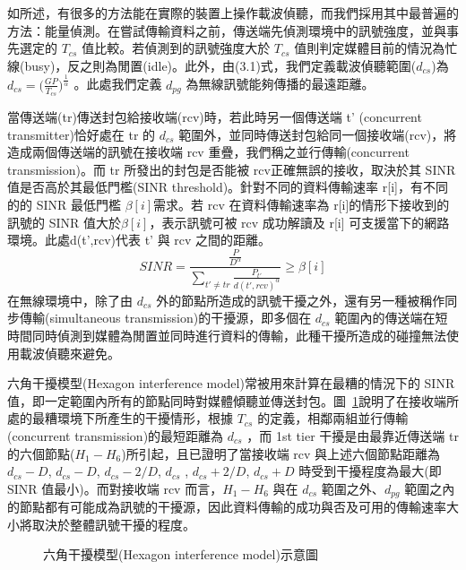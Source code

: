 \documentclass[12pt,a4paper]{article}
\newcommand{\Fig}[1]{圖~\ref{#1}}
\begin{document}
\begin{description}
\begin{enumerate}
如\cite{sigcomm05_rwpcs}所述，有很多的方法能在實際的裝置上操作載波偵聽，而我們採用其中最普遍的方法：能量偵測。在嘗試傳輸資料之前，傳送端先偵測環境中的訊號強度，並與事先選定的 $T_{cs}$ 值比較。若偵測到的訊號強度大於 $T_{cs}$ 值則判定媒體目前的情況為忙線(busy)，反之則為閒置(idle)。此外，由(3.1)式，我們定義載波偵聽範圍($d_{cs}$)為 $d_{cs} =  \big( \frac{GP}{T_{cs}} \big)^{ \frac{1}{\alpha}}$ 。此處我們定義 $d_{pg}$ 為無線訊號能夠傳播的最遠距離。 

當傳送端(tr)傳送封包給接收端(rcv)時，若此時另一個傳送端 t' (concurrent transmitter)恰好處在 tr 的 $d_{cs}$ 範圍外，並同時傳送封包給同一個接收端(rcv)，將造成兩個傳送端的訊號在接收端 rcv 重疊，我們稱之並行傳輸(concurrent transmission)。而 tr 所發出的封包是否能被 rcv正確無誤的接收，取決於其 SINR 值是否高於其最低門檻(SINR threshold)。針對不同的資料傳輸速率 r[i]，有不同的的 SINR 最低門檻 $\beta[i]$需求。若 rcv 在資料傳輸速率為 r[i]的情形下接收到的訊號的 SINR 值大於$\beta[i]$，表示訊號可被 rcv 成功解讀及 r[i] 可支援當下的網路環境。此處d(t',rcv)代表 t' 與 rcv 之間的距離。 
$$
SINR =  \frac{\frac{P}{D^ \alpha}}{ \sum_{t' \neq tr} \frac{P_{t'}}{d(t',rcv)^ \alpha} } \geq \beta[i]
$$
在無線環境中，除了由 $d_{cs}$ 外的節點所造成的訊號干擾之外，還有另一種被稱作同步傳輸(simultaneous transmission)的干擾源，即多個在 $d_{cs}$ 範圍內的傳送端在短時間同時偵測到媒體為閒置並同時進行資料的傳輸，此種干擾所造成的碰撞無法使用載波偵聽來避免。 

六角干擾模型(Hexagon interference model)常被用來計算在最糟的情況下的 SINR 值，即一定範圍內所有的節點同時對媒體傾聽並傳送封包。\Fig{fig:hexagon_model}說明了在接收端所處的最糟環境下所產生的干擾情形，根據 $T_{cs}$ 的定義，相鄰兩組並行傳輸(concurrent transmission)的最短距離為 $d_{cs}$ ，而 1st tier 干擾是由最靠近傳送端 tr 的六個節點($H_1 - H_6$)所引起，且\cite{tvt1986_cmrs}已證明了當接收端 rcv 與上述六個節點距離為 $d_{cs}-D$, $d_{cs}-D$, $d_{cs}-2/D$, $d_{cs}$ , $d_{cs}+2/D$, $d_{cs}+D$ 時受到干擾程度為最大(即 SINR 值最小)。而對接收端 rcv 而言，$H_1 - H_6$ 與在 $d_{cs}$ 範圍之外、$d_{pg}$ 範圍之內的節點都有可能成為訊號的干擾源，因此資料傳輸的成功與否及可用的傳輸速率大小將取決於整體訊號干擾的程度。

\begin{figure}[hbt]
\begin{center}
\caption{六角干擾模型(Hexagon interference model)示意圖} \label{fig:hexagon_model}
\vspace{-0.2cm}
\end{center}
\end{figure}


\end{enumerate}
\end{description}
\end{document}
